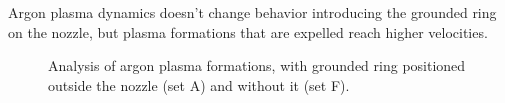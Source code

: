 Argon plasma dynamics doesn't change behavior introducing the grounded ring on the nozzle, but plasma formations that are expelled reach higher velocities.

\begin{figure}
 \centering
 \hfill
 
 
 \hfill
 \caption{Analysis of argon plasma formations, with grounded ring positioned outside the nozzle (set A) and without it (set F).}
 \label{fig:argon_af}
\end{figure}

